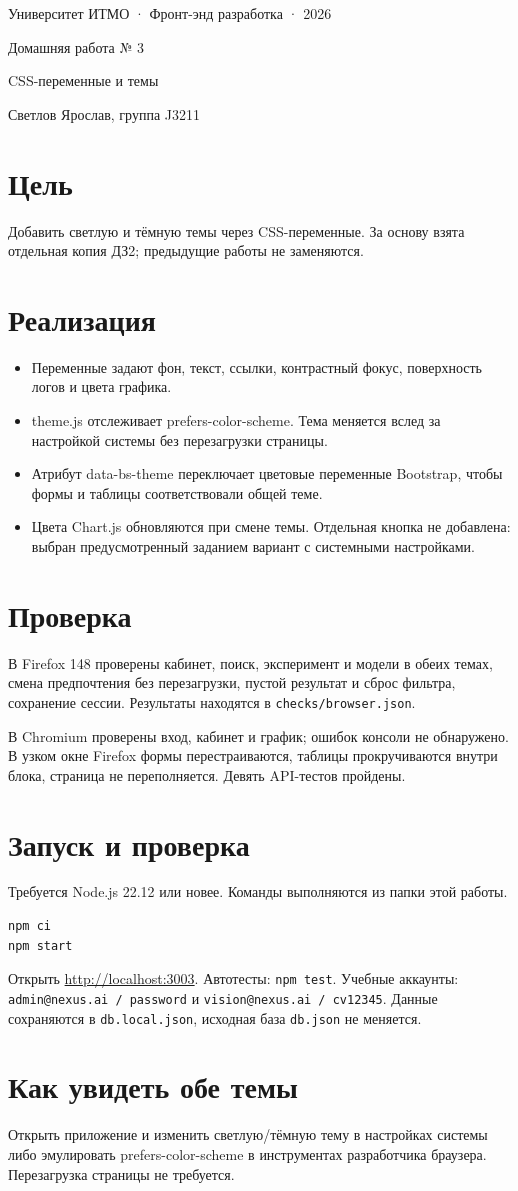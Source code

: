 \documentclass[11pt,a4paper]{article}
\begin{document}
\begin{center}
{\small Университет ИТМО · Фронт-энд разработка · 2026}\par
{\LARGE Домашняя работа № 3}\par
{\large CSS-переменные и темы}\par
Светлов Ярослав, группа J3211
\end{center}
\section*{Цель}
Добавить светлую и тёмную темы через CSS-переменные. За основу взята отдельная копия ДЗ2; предыдущие работы не заменяются.
\section*{Реализация}
\begin{itemize}
\item Переменные задают фон, текст, ссылки, контрастный фокус, поверхность логов и цвета графика.
\item theme.js отслеживает prefers-color-scheme. Тема меняется вслед за настройкой системы без перезагрузки страницы.
\item Атрибут data-bs-theme переключает цветовые переменные Bootstrap, чтобы формы и таблицы соответствовали общей теме.
\item Цвета Chart.js обновляются при смене темы. Отдельная кнопка не добавлена: выбран предусмотренный заданием вариант с системными настройками.
\end{itemize}

\section*{Проверка}
В Firefox 148 проверены кабинет, поиск, эксперимент и модели в обеих темах, смена предпочтения без перезагрузки, пустой результат и сброс фильтра, сохранение сессии. Результаты находятся в \texttt{checks/browser.json}.

В Chromium проверены вход, кабинет и график; ошибок консоли не обнаружено. В узком окне Firefox формы перестраиваются, таблицы прокручиваются внутри блока, страница не переполняется. Девять API-тестов пройдены.
\section*{Запуск и проверка}
Требуется Node.js 22.12 или новее. Команды выполняются из папки этой работы.
\begin{verbatim}
npm ci
npm start
\end{verbatim}
Открыть \url{http://localhost:3003}. Автотесты: \texttt{npm test}.
Учебные аккаунты: \texttt{admin@nexus.ai / password} и \texttt{vision@nexus.ai / cv12345}. Данные сохраняются в \texttt{db.local.json}, исходная база \texttt{db.json} не меняется.\section*{Как увидеть обе темы}
Открыть приложение и изменить светлую/тёмную тему в настройках системы либо эмулировать prefers-color-scheme в инструментах разработчика браузера. Перезагрузка страницы не требуется.
\end{document}
